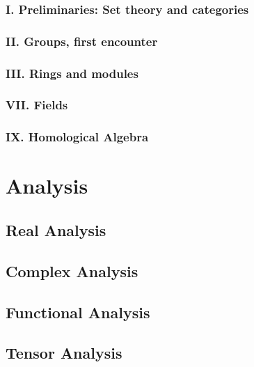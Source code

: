 \documentclass[openany]{book}
\begin{document}
\subsection{I. Preliminaries: Set theory and categories}
\subsection{II. Groups, first encounter}
\subsection{III. Rings and modules}
\subsection{VII. Fields}
\subsection{IX. Homological Algebra}

\chapter{Analysis}
\section{Real Analysis}
\section{Complex Analysis}
\section{Functional Analysis}
\section{Tensor Analysis}
\end{document}
